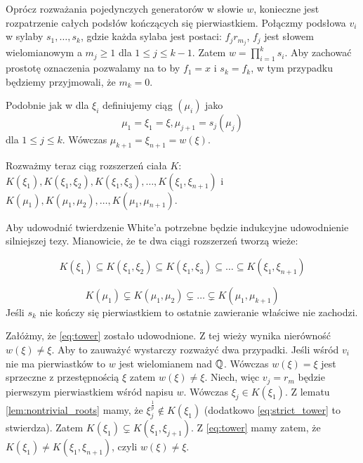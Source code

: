 Oprócz rozważania pojedynczych generatorów w słowie $w$, konieczne jest
rozpatrzenie całych podsłów kończących się pierwiastkiem. Połączmy podsłowa
$v_i$ w sylaby $s_1, \ldots, s_k$, gdzie każda sylaba jest postaci:
$f_jr_{m_j}$, $f_j$ jest słowem wielomianowym a $m_j \geq 1$ dla
$1 \leq j \leq k-1$. Zatem $w = \prod_{i=1}^k s_i$.
Aby zachować prostotę oznaczenia pozwalamy na to by $f_1 = x$  i $s_k = f_k$, w
tym przypadku będziemy przyjmowali, że $m_k = 0$.

Podobnie jak w dla $\xi_i$ definiujemy ciąg $\left(\mu_i\right)$ jako
\[\mu_1 = \xi_1 = \xi, \mu_{j+1} = s_j\left(\mu_j\right)\]
dla $1 \leq j \leq k$. Wówczas $\mu_{k+1} = \xi_{n+1} = w(\xi)$.

Rozważmy teraz ciąg rozszerzeń ciała $K$:
$
K\left(\xi_1\right),
K\left(\xi_1, \xi_2\right),
K\left(\xi_1, \xi_3\right),
\ldots,
K\left(\xi_1, \xi_{n+1}\right)$ i
$
K\left(\mu_1\right),
K\left(\mu_1, \mu_2\right),
\ldots,
K\left(\mu_1, \mu_{n+1}\right)$.

Aby udowodnić twierdzenie White'a potrzebne będzie indukcyjne udowodnienie
silniejszej tezy. Mianowicie, że te dwa ciągi rozszerzeń tworzą wieże:

\begin{equation}
K\left(\xi_1\right) \subseteq
K\left(\xi_1, \xi_2\right) \subseteq
K\left(\xi_1, \xi_3\right) \subseteq
\ldots
\subseteq
K\left(\xi_1, \xi_{n+1}\right)
\label{eq:tower}
\end{equation}

\begin{equation}
  K(\mu_1) \subsetneq
  K(\mu_1, \mu_2) \subsetneq
  \ldots \subsetneq
  K(\mu_1, \mu_{k+1})
  \label{eq:strict_tower}
\end{equation}
Jeśli $s_k$ nie kończy się pierwiastkiem to ostatnie zawieranie właściwe nie
zachodzi.

Załóżmy, że \ref{eq:tower} zostało udowodnione. Z tej wieży wynika nierówność
$w\left(\xi\right) \neq \xi$. Aby to zauważyć wystarczy rozważyć dwa przypadki.
Jeśli wśród $v_i$ nie ma pierwiastków to $w$ jest wielomianem nad $\mathbb{Q}$. Wówczas
$w(\xi) = \xi$ jest sprzeczne z przestępnością $\xi$ zatem $w(\xi) \neq \xi$.
Niech, więc $v_j = r_m$ będzie pierwszym pierwiastkiem wśród napisu $w$. Wówczas
$\xi_j \in K\left(\xi_1\right)$. Z lematu \ref{lem:nontrivial_roots} mamy, że
$\xi_{j}^{\frac{1}{p}} \not \in K(\xi_1)$ (dodatkowo \ref{eq:strict_tower} to
stwierdza). Zatem $K\left(\xi_1\right) \subsetneq K\left(\xi_1,
\xi_{j+1}\right)$. Z \ref{eq:tower} mamy zatem, że $K\left(\xi_1\right) \neq
K\left(\xi_1, \xi_{n+1}\right)$, czyli $w(\xi) \neq \xi$.

